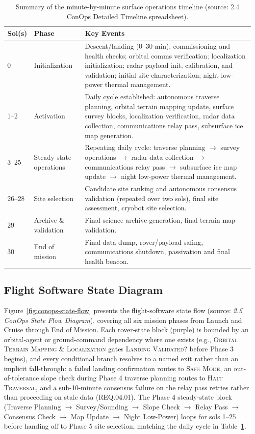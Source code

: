 \documentclass[11pt]{article}
\begin{document}
\begin{table}[H]
\centering
\footnotesize
\begin{tabular}{p{2cm}p{2.2cm}p{9cm}}
\toprule
\textbf{Sol(s)} & \textbf{Phase} & \textbf{Key Events} \\
\midrule
0 & Initialization & Descent/landing ($0$--30 min); commissioning and health checks; orbital comms
verification; localization initialization; radar payload init, calibration, and validation;
initial site characterization; night low-power thermal management. \\
1--2 & Activation & Daily cycle established: autonomous traverse planning, orbital terrain
mapping update, surface survey blocks, localization verification, radar data collection,
communications relay pass, subsurface ice map generation. \\
3--25 & Steady-state operations & Repeating daily cycle: traverse planning $\to$ survey
operations $\to$ radar data collection $\to$ communications relay pass $\to$ subsurface ice map
update $\to$ night low-power thermal management. \\
26--28 & Site selection & Candidate site ranking and autonomous consensus validation (repeated
over two sols), final site assessment, cryobot site selection. \\
29 & Archive \& validation & Final science archive generation, final terrain map validation. \\
30 & End of mission & Final data dump, rover/payload safing, communications shutdown,
passivation and final health beacon. \\
\bottomrule
\end{tabular}
\caption{Summary of the minute-by-minute surface operations timeline (source: 2.4 ConOps
Detailed Timeline spreadsheet).}
\label{tab:conops-daily-cycle}
\end{table}

\subsection{Flight Software State Diagram}

Figure~\ref{fig:conops-state-flow} presents the flight-software state flow (source: \textit{2.5
ConOps State Flow Diagram}), covering all six mission phases from Launch and Cruise through End
of Mission. Each rover-state block (purple) is bounded by an orbital-agent or ground-command
dependency where one exists (e.g., \textsc{Orbital Terrain Mapping \& Localization} gates
\textsc{Landing Validated?} before Phase 3 begins), and every conditional branch resolves to a
named exit rather than an implicit fall-through: a failed landing confirmation routes to
\textsc{Safe Mode}, an out-of-tolerance slope check during Phase 4 traverse planning routes to
\textsc{Halt Traversal}, and a sub-10-minute consensus failure on the relay pass retries rather
than proceeding on stale data (REQ.04.01). The Phase 4 steady-state block (Traverse Planning
$\to$ Survey/Sounding $\to$ Slope Check $\to$ Relay Pass $\to$ Consensus Check $\to$ Map Update
$\to$ Night Low-Power) loops for sols 1--25 before handing off to Phase 5 site selection, matching
the daily cycle in Table~\ref{tab:conops-daily-cycle}.
\end{document}
